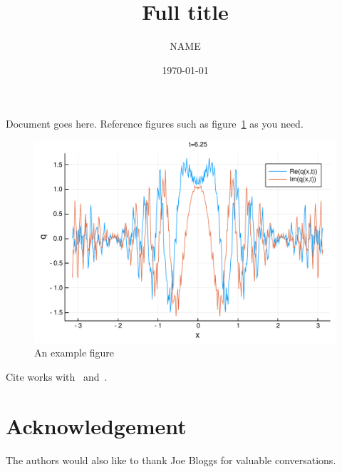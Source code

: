 \documentclass[11pt,reqno,oneside,a4paper]{article}
\author{NAME}
\title{Full title}
\date{\today}
\begin{document}
\maketitle
\thispagestyle{fancy}




Document goes here.
Reference figures such as figure~\ref{fig:eg} as you need.
\begin{figure}
    \centering
    \includegraphics[width=0.8\linewidth]{gfx/fig-eg}
    \caption{An example figure}
    \label{fig:eg}
\end{figure}
Cite works with~\cite{Fou1822a} and~\cite[proposition~2.12]{Xia2019a}.


\section*{Acknowledgement}

\AckYNCSRP{\theauthor}
The authors would also like to thank Joe Bloggs for valuable conversations.


{\small}
\end{document}
